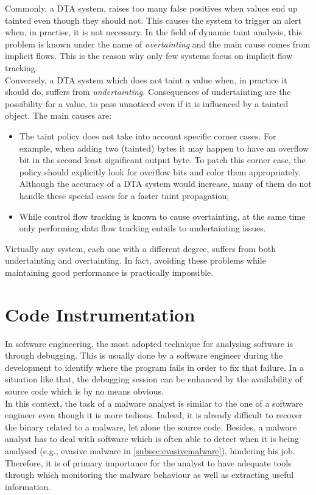 \documentclass[LaM,binding=0.6cm]{sapthesis}
\begin{document}
Commonly, a DTA system, raises too many false positives when values end up tainted even though they should not. This causes the system to trigger an alert when, in practise, it is not necessary. In the field of dynamic taint analysis, this problem is known under the name of \textit{overtainting} and the main cause comes from implicit flows. This is the reason why only few systems focus on implicit flow tracking.\\
Conversely, a DTA system which does not taint a value when, in practice it should do, suffers from \textit{undertainting}. Consequences of undertainting are the possibility for a value, to pass unnoticed even if it is influenced by a tainted object. The main causes are:
\begin{itemize}
\item The taint policy does not take into account specific corner cases. For example, when adding two (tainted) bytes it may happen to have an overflow bit in the second least significant output byte. To patch this corner case, the policy should explicitly look for overflow bits and color them appropriately. Although the accuracy of a DTA system would increase, many of them do not handle these special cases for a faster taint propagation;
\item While control flow tracking is known to cause overtainting, at the same time only performing data flow tracking entails to undertainting issues.
\end{itemize}
Virtually any system, each one with a different degree, suffers from both undertainting and overtainting. In fact, avoiding these problems while maintaining good performance is practically impossible.
\newpage
\section{Code Instrumentation}
In software engineering, the most adopted technique for analysing software is through debugging. This is usually done by a software engineer during the development to identify where the program fails in order to fix that failure. In a situation like that, the debugging session can be enhanced by the availability of source code which is by no means obvious.\\
In this context, the task of a malware analyst is similar to the one of a software engineer even though it is more tedious. Indeed, it is already difficult to recover the binary related to a malware, let alone the source code. Besides, a malware analyst has to deal with software which is often able to detect when it is being analysed (e.g., evasive malware in \autoref{subsec:evasivemalware}), hindering his job. Therefore, it is of primary importance for the analyst to have adequate tools through which monitoring the malware behaviour as well as extracting useful information.\\ 
\end{document}
